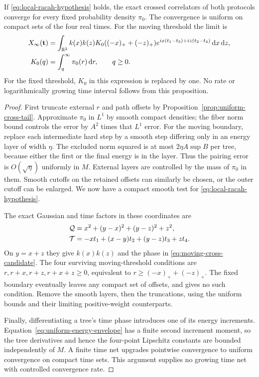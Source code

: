 \begin{proposition}
If \eqref{eq:local-racah-hypothesis} holds, the exact crossed correlators
of both protocols converge for every fixed probability density $\pi_0$.
The convergence is uniform on compact sets of the four real times. For
the moving threshold the limit is
\begin{align}
 X_\infty(\mathbf t)
 &=\int_{\mathbb R^2}k(x)k(z)
      K_0((-x)_++(-z)_+)
      e^{ix(t_1-t_3)+iz(t_2-t_4)}\mathop{}\!\mathrm d x\mathop{}\!\mathrm d z,\notag\\
 K_0(q)&=\int_q^\infty\pi_0(r)\mathop{}\!\mathrm d r,\qquad q\ge0.
 \label{eq:moving-cross-candidate}
\end{align}
For the fixed threshold, $K_0$ in this expression is replaced by one.
No rate or logarithmically growing time interval follows from this
proposition.
\label{prop:conditional-cross-limit}
\end{proposition}
\begin{proof}
First truncate external $r$ and path offsets by
Proposition~\ref{prop:uniform-cross-tail}. Approximate $\pi_0$ in $L^1$
by smooth compact densities; the fiber norm bound controls the error by
$A^2$ times that $L^1$ error. For the moving boundary, replace each
intermediate hard step by a smooth step differing only in an energy
layer of width $\eta$. The excluded norm squared is at most
$2\eta A\sup B$ per tree, because either the first or the final energy
is in the layer. Thus the pairing error is $O(\sqrt\eta)$ uniformly in
$M$. External layers are controlled by the mass of $\pi_0$ in them.
Smooth cutoffs on the retained offsets can similarly be chosen, or the
outer cutoff can be enlarged. We now have a compact smooth test for
\eqref{eq:local-racah-hypothesis}.

The exact Gaussian and time factors in these coordinates are
\begin{align}
 \mathcal Q&=x^2+(y-x)^2+(y-z)^2+z^2,\notag\\
 \mathcal T&=-xt_1+(x-y)t_2+(y-z)t_3+zt_4.
\end{align}
On $y=x+z$ they give $k(x)k(z)$ and the phase in
\eqref{eq:moving-cross-candidate}. The four surviving moving-threshold
conditions are $r,r+x,r+z,r+x+z\ge0$, equivalent to
$r\ge(-x)_++(-z)_+$. The fixed boundary eventually leaves any compact
set of offsets, and gives no such condition. Remove the smooth layers,
then the truncations, using the uniform bounds and their limiting
positive-weight counterparts.

Finally, differentiating a tree's time phase introduces one of its
energy increments. Equation~\eqref{eq:uniform-energy-envelope} has a
finite second increment moment, so the tree derivatives and hence the
four-point Lipschitz constants are bounded independently of $M$.
A finite time net upgrades pointwise convergence to uniform convergence
on compact time sets. This argument supplies no growing time net with
controlled convergence rate.
\end{proof}

